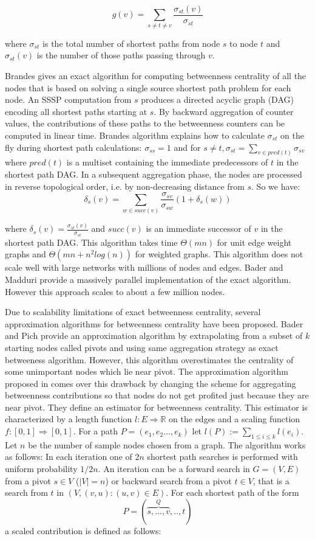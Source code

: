 \documentclass[runningheads,a4paper]{llncs}
\begin{document}
$$g(v) = \sum_{s \neq t \neq v} \frac{\sigma_{st}(v)}{\sigma_{st}}$$

where $\sigma_{st}$ is the total number of shortest paths from node $s$ to node $t$ and $\sigma_{st}(v)$ is the number of those paths passing through $v$.

Brandes\cite{brandes} gives an exact algorithm for computing betweenness centrality of all the nodes that is based on solving a single source shortest path problem for each node. An SSSP computation from $s$ produces a directed acyclic graph (DAG) encoding all shortest paths starting at $s$. By backward aggregation of counter values, the contributions of these paths to the betweenness counters can be computed in linear time. Brandes algorithm explains how to calculate $\sigma_{st}$ on the fly during shortest path calculations: $\sigma_{ss} = 1$ and for $s \neq t, \sigma_{st} = \sum_{v \in pred(t)} \sigma_{sv}$ where $pred(t)$ is a multiset containing the immediate predecessors of  $t$ in the shortest path DAG. In a subsequent aggregation phase, the nodes are processed in reverse topological order, i.e. by non-decreasing distance from $s$. So we have: 
$$\delta_{s}(v) = \sum_{w \in succ(v)} \frac{\sigma_{sv}}{\sigma_{sw}}(1+\delta_{s}(w))$$

where $\delta_{s}(v) = \frac{\sigma_{st}(v)}{\sigma_{st}}$ and $succ(v)$ is an immediate successor of $v$  in the shortest path DAG.   
This algorithm takes time $\Theta(mn)$ for unit edge weight graphs and $\Theta(mn + n^{2}log(n))$ for weighted graphs. This algorithm does not scale well with large networks with millions of nodes and edges. Bader and Madduri\cite{bader} provide a massively parallel implementation of the exact algorithm. However this approach scales to about a few million nodes. 

Due to scalability limitations of exact betweenness centrality, several approximation algorithms for betweenness centrality have been proposed. Bader and Pich\cite{bp} provide an approximation algorithm by extrapolating from a subset of $k$ starting nodes called pivots and using same aggregation strategy as exact betweeness algorithm. However, this algorithm overestimates the centrality of some unimportant nodes which lie near pivot. The approximation algorithm proposed in \cite{sanders} comes over this drawback by changing the scheme for aggregating betweenness contributions so that nodes do not get profited just because they are near pivot. They define an estimator for betweenness centrality. This estimator is characterized by a length function $l : E \Rightarrow \mathbb{R}$ on the edges and a scaling function $f : [0,1] \Rightarrow [0,1]$. For a path $P = (e_{1},e_{2}...,e_{k})$ let $l(P) := \sum_{1 \leq i \leq k} l(e_{i})$. Let $n$ be the number of sample nodes chosen from a graph. The algorithm works as follows: In each iteration one of $2n$ shortest path searches is performed with uniform probability $1/2n$. An iteration can be a forward search in $G = (V,E)$ from a pivot $s \in V$ ($|V| = n$) or backward search from a pivot $t \in V$, that is a search from $t$ in $(V,{(v,u) : (u,v) \in E})$. For each shortest path of the form 
$$ P = (\overbrace{s,...,v}^{Q},..,t)$$ 
a scaled contribution is defined as follows:\\
\end{document}
